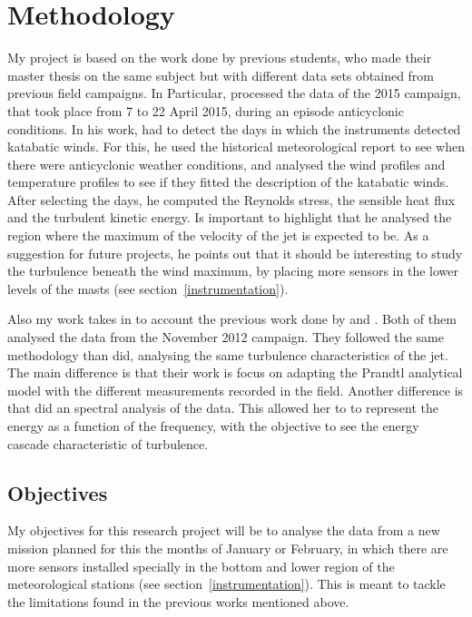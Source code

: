 \documentclass[a4paper,12pt]{article}
\begin{document}
\section{Methodology}
My project is based on the work done by previous students, who made their master thesis on the same subject but with different data sets obtained from previous field campaigns. In Particular, \cite{jakob} processed the data of the 2015 campaign, that took place from 7 to 22 April 2015, during an episode anticyclonic conditions. In his work, had to detect the days in which the instruments detected katabatic winds. For this, he used the historical meteorological report to see when there were anticyclonic weather conditions, and analysed the wind profiles and temperature profiles to see if they fitted the description of the katabatic winds. After selecting the days, he computed the Reynolds stress, the sensible heat flux and the turbulent kinetic energy. Is important to highlight that he analysed the region where the maximum of the velocity of the jet is expected to be. As a suggestion for future projects, he points out that it should be interesting to study the turbulence beneath the wind maximum, by placing more sensors in the lower levels of the masts (see section~\ref{instrumentation}).

Also my work takes in to account the previous work done by \cite{claudine} and \cite{alban}. Both of them analysed the data from the November 2012 campaign. They followed the same methodology than \cite{jakob} did, analysing the same turbulence characteristics of the jet. The main difference is that their work is focus on adapting the Prandtl analytical model with the different measurements recorded in the field. Another difference is that \cite{claudine} did an spectral analysis of the data. This allowed her to to represent the energy as a function of the frequency, with the objective to see the energy cascade characteristic of turbulence. 

\subsection{Objectives}
My objectives for this research project will be to analyse the data from a new mission planned for this the months of January or February, in which there are more sensors installed specially in the bottom and lower region of the meteorological stations (see section~\ref{instrumentation}). This is meant to tackle the limitations found in the previous works mentioned above. 
\end{document}
